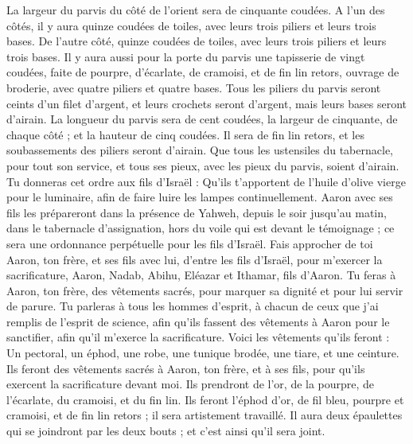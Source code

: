 \begin{multicols}{2}
La largeur du parvis du côté de l'orient sera de cinquante coudées.
A l'un des côtés, il y aura quinze coudées de toiles, avec leurs trois piliers et leurs trois bases.
De l'autre côté, quinze coudées de toiles, avec leurs trois piliers et leurs trois bases.
Il y aura aussi pour la porte du parvis une tapisserie de vingt coudées, faite de pourpre, d'écarlate, de cramoisi, et de fin lin retors, ouvrage de broderie, avec quatre piliers et quatre bases.
Tous les piliers du parvis seront ceints d'un filet d'argent, et leurs crochets seront d'argent, mais leurs bases seront d'airain.
La longueur du parvis sera de cent coudées, la largeur de cinquante, de chaque côté ; et la hauteur de cinq coudées. Il sera de fin lin retors, et les soubassements des piliers seront d'airain.
Que tous les ustensiles du tabernacle, pour tout son service, et tous ses pieux, avec les pieux du parvis, soient d'airain.
Tu donneras cet ordre aux fils d'Israël : Qu'ils t'apportent de l'huile d'olive vierge pour le luminaire, afin de faire luire les lampes continuellement.
Aaron avec ses fils les prépareront dans la présence de Yahweh, depuis le soir jusqu'au matin, dans le tabernacle d'assignation, hors du voile qui est devant le témoignage ; ce sera une ordonnance perpétuelle pour les fils d'Israël.
\VerseOne{}Fais approcher de toi Aaron, ton frère, et ses fils avec lui, d'entre les fils d'Israël, pour m'exercer la sacrificature, Aaron, Nadab, Abihu, Eléazar et Ithamar, fils d'Aaron.
Tu feras à Aaron, ton frère, des vêtements sacrés, pour marquer sa dignité et pour lui servir de parure.
Tu parleras à tous les hommes d'esprit, à chacun de ceux que j'ai remplis de l'esprit de science, afin qu'ils fassent des vêtements à Aaron pour le sanctifier, afin qu'il m'exerce la sacrificature.
Voici les vêtements qu’ils feront : Un pectoral, un éphod, une robe, une tunique brodée, une tiare, et une ceinture. Ils feront des vêtements sacrés à Aaron, ton frère, et à ses fils, pour qu’ils exercent la sacrificature devant moi.
Ils prendront de l'or, de la pourpre, de l'écarlate, du cramoisi, et du fin lin.
Ils feront l’éphod d’or, de fil bleu, pourpre et cramoisi, et de fin lin retors ; il sera artistement travaillé.
Il aura deux épaulettes qui se joindront par les deux bouts ; et c’est ainsi qu’il sera joint.

\end{multicols}
